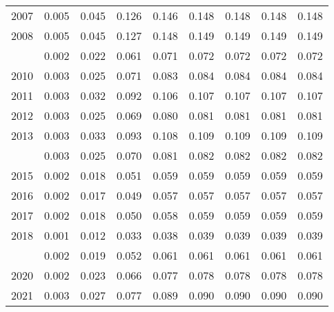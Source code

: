 \documentclass[
]{article}
\begin{document}
\begin{longtable}[t]{lrrrrrrrr}
2007 & 0.005 & 0.045 & 0.126 & 0.146 & 0.148 & 0.148 & 0.148 & 0.148\\
2008 & 0.005 & 0.045 & 0.127 & 0.148 & 0.149 & 0.149 & 0.149 & 0.149\\
\addlinespace
2009 & 0.002 & 0.022 & 0.061 & 0.071 & 0.072 & 0.072 & 0.072 & 0.072\\
2010 & 0.003 & 0.025 & 0.071 & 0.083 & 0.084 & 0.084 & 0.084 & 0.084\\
2011 & 0.003 & 0.032 & 0.092 & 0.106 & 0.107 & 0.107 & 0.107 & 0.107\\
2012 & 0.003 & 0.025 & 0.069 & 0.080 & 0.081 & 0.081 & 0.081 & 0.081\\
2013 & 0.003 & 0.033 & 0.093 & 0.108 & 0.109 & 0.109 & 0.109 & 0.109\\
\addlinespace
2014 & 0.003 & 0.025 & 0.070 & 0.081 & 0.082 & 0.082 & 0.082 & 0.082\\
2015 & 0.002 & 0.018 & 0.051 & 0.059 & 0.059 & 0.059 & 0.059 & 0.059\\
2016 & 0.002 & 0.017 & 0.049 & 0.057 & 0.057 & 0.057 & 0.057 & 0.057\\
2017 & 0.002 & 0.018 & 0.050 & 0.058 & 0.059 & 0.059 & 0.059 & 0.059\\
2018 & 0.001 & 0.012 & 0.033 & 0.038 & 0.039 & 0.039 & 0.039 & 0.039\\
\addlinespace
2019 & 0.002 & 0.019 & 0.052 & 0.061 & 0.061 & 0.061 & 0.061 & 0.061\\
2020 & 0.002 & 0.023 & 0.066 & 0.077 & 0.078 & 0.078 & 0.078 & 0.078\\
2021 & 0.003 & 0.027 & 0.077 & 0.089 & 0.090 & 0.090 & 0.090 & 0.090\\*
\end{longtable}
\end{document}

